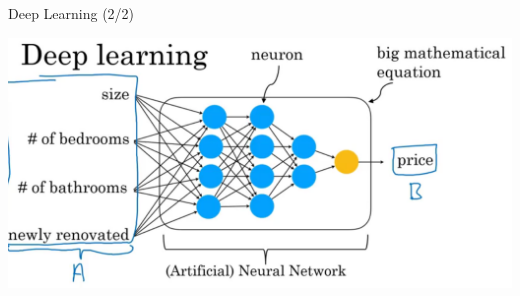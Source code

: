 \documentclass[pdf]{beamer}
\theoremstyle{mystyle}
\begin{document}
\begin{frame}{Deep Learning (2/2)}
	\begin{center}
		\includegraphics[scale=.24]{deep-learning-2}
	\end{center}	
\end{frame}
\end{document}
